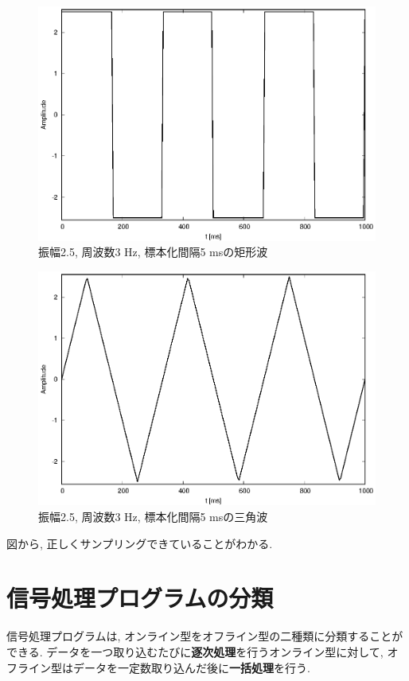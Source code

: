 \documentclass[titlepage]{jsarticle}
\begin{document}
        \begin{figure}[h]
            \centering
            \includegraphics[width=0.8\hsize]{images/squaft.eps}
            \caption{振幅2.5, 周波数3 Hz, 標本化間隔5 msの矩形波}
            \label{fig:squaft}
        \end{figure}

        \begin{figure}[h]
            \centering
            \includegraphics[width=0.8\hsize]{images/triaft.eps}
            \caption{振幅2.5, 周波数3 Hz, 標本化間隔5 msの三角波}
            \label{fig:triaft}
        \end{figure}

        図から, 正しくサンプリングできていることがわかる.

\section{信号処理プログラムの分類}
    信号処理プログラムは, オンライン型をオフライン型の二種類に分類することができる.
    データを一つ取り込むたびに\textbf{逐次処理}を行うオンライン型に対して,
    オフライン型はデータを一定数取り込んだ後に\textbf{一括処理}を行う.
\end{document}

